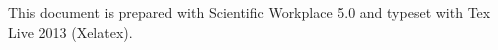 \documentclass[12pt,a4paper]{article}
\begin{document}
\href{https://drive.google.com/file/d/0B96HmLH-SQVmekx0a0RoSVFzWFE/edit?usp=sharing%
}{\underline{\color{blue}}}

\href{http://tinypic.com/r/10cw9yf/8}{\underline{\color{blue}%
}}

This document is prepared with Scientific Workplace 5.0 and typeset with Tex
Live 2013 (Xelatex).
\end{document}

